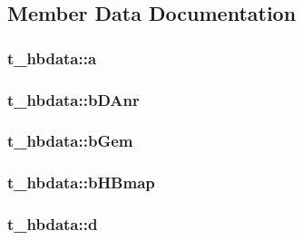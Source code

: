 \subsection{\-Member \-Data \-Documentation}
\hypertarget{structt__hbdata_ae8446218dec0d6ed71a691ba485547fb}{
\subsubsection[{a}]{ {\bf t\-\_\-hbdata\-::a}}}\label{structt__hbdata_ae8446218dec0d6ed71a691ba485547fb}
\hypertarget{structt__hbdata_aa398cc2ec3032b8a51b9fcb546f5b0f5}{
\subsubsection[{b\-D\-Anr}]{ {\bf t\-\_\-hbdata\-::b\-D\-Anr}}}\label{structt__hbdata_aa398cc2ec3032b8a51b9fcb546f5b0f5}
\hypertarget{structt__hbdata_a4a2dc3a0ec0767a23cc739bb8f534290}{
\subsubsection[{b\-Gem}]{ {\bf t\-\_\-hbdata\-::b\-Gem}}}\label{structt__hbdata_a4a2dc3a0ec0767a23cc739bb8f534290}
\hypertarget{structt__hbdata_adcf6da78418a711692a5ca9729e2ec95}{
\subsubsection[{b\-H\-Bmap}]{ {\bf t\-\_\-hbdata\-::b\-H\-Bmap}}}\label{structt__hbdata_adcf6da78418a711692a5ca9729e2ec95}
\hypertarget{structt__hbdata_a96a5dd0c3c48edff83744e27366eab5a}{
\subsubsection[{d}]{ {\bf t\-\_\-hbdata\-::d}}}\label{structt__hbdata_a96a5dd0c3c48edff83744e27366eab5a}
